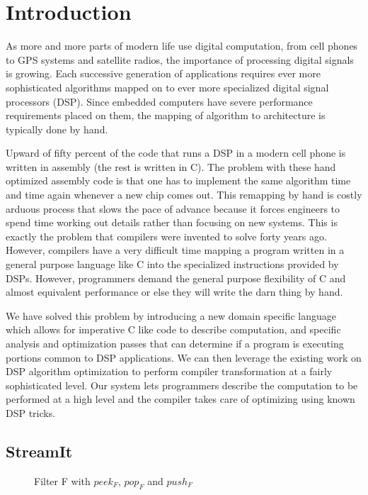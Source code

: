 \section{Introduction}
As more and more parts of modern life use digital computation, from cell phones to GPS systems
and satellite radios, the importance of processing digital signals is growing.
Each successive generation of applications requires ever more sophisticated algorithms mapped 
on to ever more specialized digital signal processors (DSP). Since embedded computers have severe performance
requirements placed on them, the mapping of algorithm to architecture is typically done by hand.

Upward of fifty percent of the code that runs a DSP in a modern cell phone is written in assembly
(the rest is written in C). The problem with these hand optimized assembly code is that one 
has to implement the same algorithm time and time again whenever a new chip comes out. 
This remapping by hand is costly arduous process that 
slows the pace of advance because it forces engineers to spend time working out details rather 
than focusing on new systems. This is exactly the problem that compilers were invented to solve
forty years ago. However, compilers have a very difficult time mapping a program written in 
a general purpose language like C into the specialized instructions provided by DSPs. However,
programmers demand the general purpose flexibility of C and almost equivalent performance
or else they will write the darn thing by hand. 

We have solved this problem by introducing a new domain specific language which
allows for imperative C like code to describe computation, and 
specific analysis and optimization passes that can determine if a program is
executing portions common to DSP applications. We can then leverage
the existing work on DSP algorithm optimization to perform compiler transformation
at a fairly sophisticated level. Our system lets programmers describe the
computation to be performed at a high level and the compiler takes care of optimizing
using known DSP tricks.

\subsection{StreamIt}

\begin{figure}
\center
\epsfxsize=3.0in
\caption{Filter F with $peek_{F}$, $pop_{F}$ and $push_{F}$}
\label{fig:overview-filter}
\end{figure}


